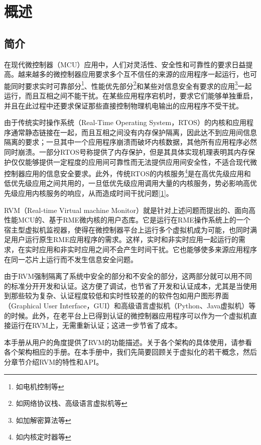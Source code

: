 \chapter{概述}\label{ch:1-overview}

\section{简介}\label{sec:1-1}

在现代微控制器（MCU）应用中，人们对灵活性、安全性和可靠性的要求日益提高。越来越多的微控制器应用要求多个互不信任的来源的应用程序一起运行，也可能同时要求实时可靠部分\footnote{如电机控制等}、性能优先部分\footnote{如网络协议栈、高级语言虚拟机等}和某些对信息安全有要求的应用\footnote{如加解密算法等}一起运行，而且互相之间不能干扰。在某些应用程序宕机时，要求它们能够单独重启，并且在此过程中还要求保证那些直接控制物理机电输出的应用程序不受干扰。

由于传统实时操作系统（Real-Time Operating
System，RTOS）的内核和应用程序通常静态链接在一起，而且互相之间没有内存保护隔离，因此达不到应用间信息隔离的要求；一旦其中一个应用程序崩溃而破坏内核数据，其他所有应用程序必然同时崩溃。一部分RTOS号称提供了内存保护，但是其具体实现机理表明其内存保护仅仅能够提供一定程度的应用间可靠性而无法提供应用间安全性，不适合现代微控制器应用的信息安全要求。此外，传统RTOS的内核服务\footnote{如内核定时器等}是在高优先级应用和低优先级应用之间共用的，一旦低优先级应用调用大量的内核服务，势必影响高优先级应用内核服务的响应，从而造成时间干扰问题\protect\hyperref[cite:1-1]{{[}1{]}}。

RVM（Real-time Virtual machine
Monitor）就是针对上述问题而提出的、面向高性能MCU的、基于RME微内核的用户态库。它是运行在RME操作系统上的一个宿主型虚拟机监视器，使得在微控制器平台上运行多个虚拟机成为可能，也同时满足用户运行原生RME应用程序的需求。这样，实时和非实时应用一起运行的需求，在实时应用和非实时应用之间不会产生时间干扰。它也能够使多来源应用程序在同一芯片上运行而不发生信息安全问题。

由于RVM强制隔离了系统中安全的部分和不安全的部分，这两部分就可以用不同的标准分开开发和认证。这方便了调试，也节省了开发和认证成本，尤其是当使用到那些较为复杂、认证程度较低和实时性较差的的软件包如用户图形界面（Graphical
User
Interface，GUI）和高级语言虚拟机（Python、Java虚拟机）等的时候。此外，在老平台上已得到认证的微控制器应用程序可以作为一个虚拟机直接运行在RVM上，无需重新认证；这进一步节省了成本。

本手册从用户的角度提供了RVM的功能描述。关于各个架构的具体使用，请参看各个架构相应的手册。在本手册中，我们先简要回顾关于虚拟化的若干概念，然后分章节介绍RVM的特性和API。

